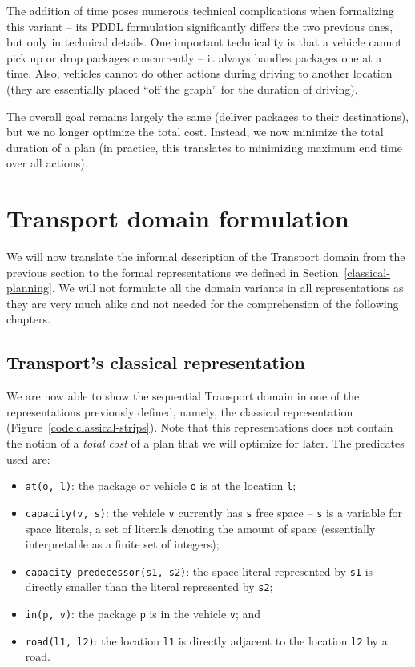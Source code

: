 The addition of time poses numerous technical complications when formalizing this variant
-- its PDDL formulation significantly differs the two previous ones, but only in technical details.
One important technicality is that a vehicle cannot pick up or drop packages concurrently -- it always handles packages one at a time. Also, vehicles cannot do other actions during driving to another location (they are essentially placed ``off the graph'' for the duration of driving).

The overall goal remains largely the same (deliver packages to their destinations), but we no longer optimize the total cost. Instead, we now minimize the total duration of a plan (in practice, this translates to minimizing
maximum end time over all actions).



\section{Transport domain formulation}

We will now translate the informal description of the Transport domain from the previous section to the formal representations we defined in Section~\ref{classical-planning}. We will not formulate all the domain variants in all representations as
they are very much alike and not needed for the comprehension of the following chapters.

\subsection{Transport's classical representation}\label{transport-classical-representation}

We are now able to show the sequential Transport domain in one of the representations
previously defined, namely,
the classical representation (Figure~\ref{code:classical-strips}).
Note that this representations does not contain the notion of a \textit{total cost}
of a plan that we will optimize for later.
The predicates used are:

\begin{itemize}
\item \verb+at(o, l)+: the package or vehicle \verb+o+ is at the
location \verb+l+;
\item \verb+capacity(v, s)+: the vehicle \verb+v+ currently has \verb+s+ free space -- \verb+s+ is a variable for space literals, a set of literals denoting the amount of space (essentially interpretable as a finite set of integers);
\item \verb+capacity-predecessor(s1, s2)+: the space literal represented by \verb+s1+
is directly smaller than the literal represented by \verb+s2+;
\item \verb+in(p, v)+: the package \verb+p+ is in the vehicle \verb+v+; and
\item \verb+road(l1, l2)+: the location \verb+l1+ is directly adjacent to the location
\verb+l2+ by a road.
\end{itemize}

